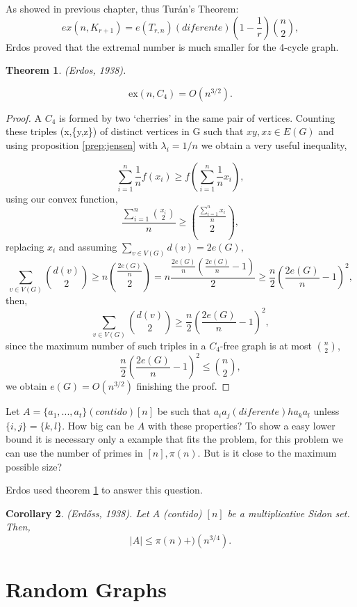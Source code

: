 \documentclass[12pt,twoside,a4paper]{book}
\numberwithin{equation}{section}
\newtheorem{theorem}             {Theorem}[section]
\newtheorem{corollary}	[theorem] {Corollary}
\theoremstyle{remark}
\begin{document}
As showed in previous chapter, thus Turán's Theorem:
$$ ex(n,K_{r+1}) = e(T_{r,n}) (diferente) \left( 1-\frac{1}{r}\right) \binom{n}{2} ,$$
Erdos proved that the extremal number is much smaller for the 4-cycle graph.
 
\begin{theorem} \label{theorem: Erdos,1938}
(Erdos, 1938).

$$\text{ex}(n,C_4) = O(n^{3/2}).$$
\end{theorem}

\begin{proof}
A $C_4$ is formed by two `cherries' in the same pair of vertices. Counting these triples (x,\{y,z\}) of distinct vertices in G such that $xy, xz \in E(G)$ and using proposition \ref{prep:jensen} with $\lambda_i = 1/n$ we obtain a very useful inequality,

$$ \sum_{i=1}^n \frac{1}{n} f\left(x_i\right) \geq f\left(\sum_{i=1}^n \frac{1}{n} x_i\right),$$
using our convex function,
$$ \frac{\sum_{i=1}^n \binom{x_i}{2}}{n} \geq \binom{\frac{\sum_{i=1}^n x_i}{n}}{2} ,$$
replacing $x_i$ and assuming $\sum_{v \in V(G)} d(v) = 2e(G),$
$$ \sum_{v \in V(G)} \binom{d(v)}{2} \geq n \binom{\frac{2e(G)}{n}}{2}= n\frac{\frac{2e(G)}{n}\left( \frac{2e(G)}{n}-1\right)}{2} \geq \frac{n}{2} \left( \frac{2e(G)}{n} - 1 \right)^2,$$
then,
$$\sum_{v \in V(G)} \binom{d(v)}{2} \geq \frac{n}{2} \left( \frac{2e(G)}{n} - 1 \right)^2,$$
since the maximum number of such triples in a $C_4$-free graph is at most $\binom{n}{2}$,
$$ \frac{n}{2}\left(\frac{2e(G)}{n} - 1\right)^2 \leq \binom{n}{2},$$
we obtain $e(G) = O(n^{3/2})$ finishing the proof.
\end{proof}

Let $A = \{a_1,...,a_t\} (contido) [n]$ be such that $a_ia_j (diferente) h a_ka_l$ unless $\{i,j\} = \{k,l\}$. How big can be $A$ with these properties?
To show a easy lower bound it is necessary only a example that fits the problem, for this problem we can use the number of primes in $[n], \pi (n)$. But is it close to the maximum possible size?

Erdos used theorem \ref{theorem: Erdos,1938} to answer this question.

\begin{corollary}(Erd\H{o}ss, 1938). Let $A$ (contido) $[n]$ be a multiplicative Sidon set. Then,
$$ |A| \leq \pi(n) + )(n^{3/4}). $$

\end{corollary}

\chapter{Random Graphs}
\end{document}

